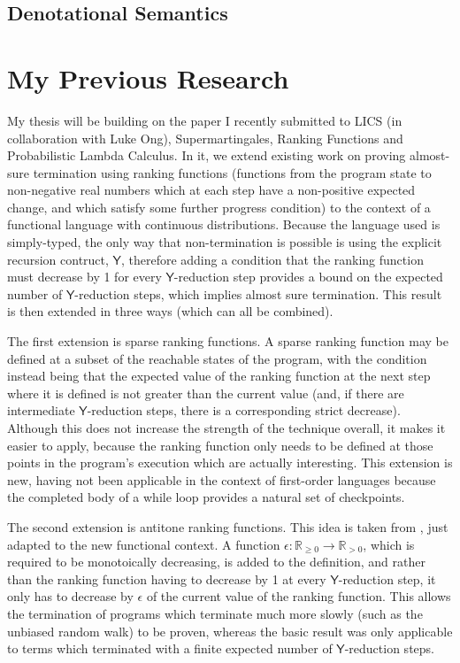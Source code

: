\documentclass[titlepage]{article}
\newcommand{\tY}{\mathsf{Y}}
\begin{document}
\subsection{Denotational Semantics}


\section{My Previous Research}
My thesis will be building on the paper I recently submitted to LICS (in collaboration with Luke Ong), Supermartingales, Ranking Functions and Probabilistic Lambda Calculus. In it, we extend existing work on proving almost-sure termination using ranking functions (functions from the program state to non-negative real numbers which at each step have a non-positive expected change, and which satisfy some further progress condition) to the context of a functional language with continuous distributions. Because the language used is simply-typed, the only way that non-termination is possible is using the explicit recursion contruct, $\tY$, therefore adding a condition that the ranking function must decrease by 1 for every $\tY$-reduction step provides a bound on the expected number of $\tY$-reduction steps, which implies almost sure termination. This result is then extended in three ways (which can all be combined).

The first extension is sparse ranking functions. A sparse ranking function may be defined at a subset of the reachable states of the program, with the condition instead being that the expected value of the ranking function at the next step where it is defined is not greater than the current value (and, if there are intermediate $\tY$-reduction steps, there is a corresponding strict decrease). Although this does not increase the strength of the technique overall, it makes it easier to apply, because the ranking function only needs to be defined at those points in the program's execution which are actually interesting. This extension is new, having not been applicable in the context of first-order languages because the completed body of a while loop provides a natural set of checkpoints.

The second extension is antitone ranking functions. This idea is taken from \cite{some citation needed}, just adapted to the new functional context. A function $\epsilon : \mathbb R_{\geq 0} \to \mathbb R_{> 0}$, which is required to be monotoically decreasing, is added to the definition, and rather than the ranking function having to decrease by 1 at every $\tY$-reduction step, it only has to decrease by $\epsilon$ of the current value of the ranking function. This allows the termination of programs which terminate much more slowly (such as the unbiased random walk) to be proven, whereas the basic result was only applicable to terms which terminated with a finite expected number of $\tY$-reduction steps.
\end{document}
